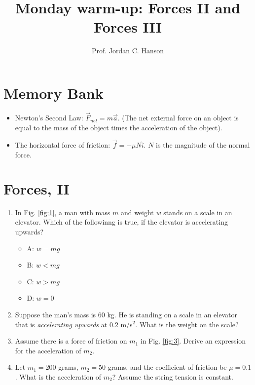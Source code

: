 \documentclass{article}
\begin{document}
\twocolumn

\title{Monday warm-up: Forces II and Forces III}
\author{Prof. Jordan C. Hanson}

\maketitle

\section{Memory Bank}

\begin{itemize}
\item Newton's Second Law: $\vec{F}_{net} = m\vec{a}$. (The net external force on an object is equal to the mass of the object times the acceleration of the object).
\item The horizontal force of friction: $\vec{f} = - \mu N \hat{i}$.  $N$ is the magnitude of the normal force.
\end{itemize}

\section{Forces, II}

\begin{enumerate}
\item In Fig. \ref{fig:1}, a man with mass $m$ and weight $w$ stands on a scale in an elevator.  Which of the followinng is true, if the elevator is accelerating upwards?
\begin{itemize}
\item A: $w = mg$
\item B: $w < mg$
\item C: $w > mg$
\item D: $w = 0$
\end{itemize}
\item Suppose the man's mass is $60$ kg.  He is standing on a scale in an elevator that is \textit{accelerating upwards} at $0.2$ m/s$^{2}$.  What is the weight on the scale? \\ \vspace{2cm}
\item Assume there is a force of friction on $m_1$ in Fig. \ref{fig:3}.  Derive an expression for the acceleration of $m_2$. \\ \vspace{2cm}
\item Let $m_1 = 200$ grams, $m_2 = 50$ grams, and the coefficient of friction be $\mu = 0.1$.  What is the acceleration of $m_2$?  Assume the string tension is constant.
\end{enumerate}
\end{document}
